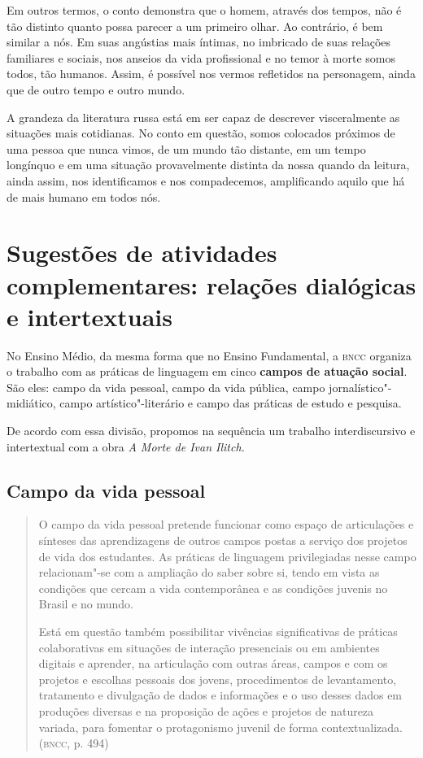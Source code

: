 \documentclass{extarticle}
\begin{document}
Em outros termos, o conto demonstra que o homem, através dos tempos, não
é tão distinto quanto possa parecer a um primeiro olhar. Ao contrário, é
bem similar a nós. Em suas angústias mais íntimas, no imbricado de suas
relações familiares e sociais, nos anseios da vida profissional e no
temor à morte somos todos, tão humanos. Assim, é possível nos vermos
refletidos na personagem, ainda que de outro tempo e outro mundo.

A grandeza da literatura russa está em ser capaz de descrever
visceralmente as situações mais cotidianas. No conto em questão, somos
colocados próximos de uma pessoa que nunca vimos, de um mundo tão
distante, em um tempo longínquo e em uma situação provavelmente distinta
da nossa quando da leitura, ainda assim, nos identificamos e nos
compadecemos, amplificando aquilo que há de mais humano em todos nós.

\section{Sugestões de atividades complementares: relações dialógicas e
intertextuais}


No Ensino Médio, da mesma forma que no Ensino Fundamental, a \textsc{bncc}
organiza o trabalho com as práticas de linguagem em cinco \textbf{campos
de atuação social}. São eles: campo da vida pessoal, campo da vida
pública, campo jornalístico"-midiático, campo artístico"-literário e campo
das práticas de estudo e pesquisa.

De acordo com essa divisão, propomos na sequência um trabalho
interdiscursivo e intertextual com a obra \emph{A Morte de Ivan Ilitch.}

\subsection{Campo da vida pessoal}

\begin{quote}
O campo da vida pessoal pretende funcionar como espaço de articulações
e sínteses das aprendizagens de outros campos postas a serviço dos
projetos de vida dos estudantes. As práticas de linguagem privilegiadas
nesse campo relacionam"-se com a ampliação do saber sobre si, tendo em
vista as condições que cercam a vida contemporânea e as condições
juvenis no Brasil e no mundo.

Está em questão também possibilitar vivências significativas de práticas
colaborativas em situações de interação presenciais ou em ambientes
digitais e aprender, na articulação com outras áreas, campos e com os
projetos e escolhas pessoais dos jovens, procedimentos de levantamento,
tratamento e divulgação de dados e informações e o uso desses dados em
produções diversas e na proposição de ações e projetos de natureza
variada, para fomentar o protagonismo juvenil de forma
contextualizada. (\textsc{bncc}, p. 494)
\end{quote}
\end{document}
